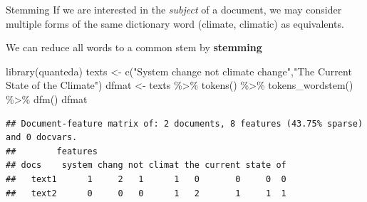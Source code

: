 \documentclass[
  10pt,
  ignorenonframetext,
  aspectratio=169]{beamer}
\newenvironment{Shaded}{\begin{snugshade}}{\end{snugshade}}
\newcommand{\FunctionTok}[1]{\textcolor[rgb]{0.94,0.94,0.56}{#1}}
\newcommand{\NormalTok}[1]{\textcolor[rgb]{0.80,0.80,0.80}{#1}}
\newcommand{\OtherTok}[1]{\textcolor[rgb]{0.94,0.94,0.56}{#1}}
\newcommand{\SpecialCharTok}[1]{\textcolor[rgb]{0.86,0.64,0.64}{#1}}
\newcommand{\StringTok}[1]{\textcolor[rgb]{0.80,0.58,0.58}{#1}}
\begin{document}
\begin{frame}[fragile]{Stemming}
\protect\hypertarget{stemming}{}
If we are interested in the \emph{subject} of a document, we may
consider multiple forms of the same dictionary word (climate, climatic)
as equivalents.

We can reduce all words to a common stem by \textbf{stemming}

\smallskip

\scriptsize

\begin{Shaded}
\begin{Highlighting}[]
\FunctionTok{library}\NormalTok{(quanteda)}
\NormalTok{texts }\OtherTok{\textless{}{-}} \FunctionTok{c}\NormalTok{(}\StringTok{"System change not climate change"}\NormalTok{,}\StringTok{"The Current State of the Climate"}\NormalTok{)}
\NormalTok{dfmat }\OtherTok{\textless{}{-}}\NormalTok{ texts }\SpecialCharTok{\%\textgreater{}\%}
  \FunctionTok{tokens}\NormalTok{() }\SpecialCharTok{\%\textgreater{}\%}
  \FunctionTok{tokens\_wordstem}\NormalTok{() }\SpecialCharTok{\%\textgreater{}\%} 
  \FunctionTok{dfm}\NormalTok{()}
\NormalTok{dfmat}
\end{Highlighting}
\end{Shaded}

\begin{verbatim}
## Document-feature matrix of: 2 documents, 8 features (43.75% sparse) and 0 docvars.
##        features
## docs    system chang not climat the current state of
##   text1      1     2   1      1   0       0     0  0
##   text2      0     0   0      1   2       1     1  1
\end{verbatim}
\end{frame}
\end{document}

